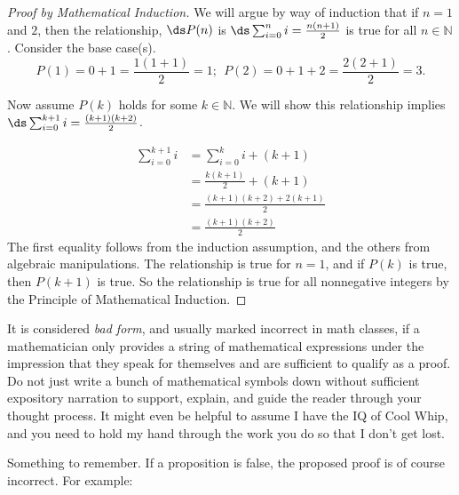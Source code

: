 \begin{theorem}[For $n \in \N$, $\ds \sum_{i = 0}^n i= \frac{n(n+1)}{2}$]

\begin{proof} [Proof by Mathematical Induction]
We will argue by way of induction that if $n =1$ and $2$, then the relationship, $\ds P(n)$ is $ \ds \sum_{i = 0}^n i= \frac{n(n+1)}{2}$ is true for all $n\in\mathbb{N}$.
Consider the base case(s).  $$P(1)=0+1=\frac{1(1+1)}{2} = 1;~~P(2)=0+ 1+2 = \frac{2(2+1)}{2} = 3.$$

Now  assume $P(k)$ holds for some $k \in\mathbb{N}$. We will show this relationship implies $\ds\sum_{i=0}^{k+1} i = \frac{(k+1)(k+2)}{2}$.


\begin{align*}
 \sum_{i=0}^{k+1} i &= \sum_{i=0}^{k} i + (k+1) \\ 
 	&= \frac{k(k+1)}{2} + (k+1) \\ 
 	&= \frac{(k+1)(k+2) + 2(k+1)}{2} \\ 
 	&= \frac{(k+1)(k+2)}{2}
\end{align*}
The first equality follows from the induction assumption, and the others from algebraic manipulations.
The relationship is true for $n=1$, and if $P(k)$ is true, then $P(k+1)$ is true. So the relationship is true for all nonnegative integers by the Principle of Mathematical Induction. 
\end{proof}
\end{theorem}

\begin{remark}It is considered \emph{bad form}, and usually  marked incorrect in math classes, if a mathematician only provides a string of mathematical expressions under the impression that they speak for themselves and are sufficient to qualify as a proof.  Do not just write a bunch of mathematical symbols down without sufficient expository narration to support, explain, and guide the reader through your thought process.  It might even be helpful to assume I have the IQ of Cool Whip, and you need to hold my hand through the work you do so that I don't get lost.
\end{remark}
Something to remember.  If a proposition is false, the proposed proof is of course incorrect. For example:



